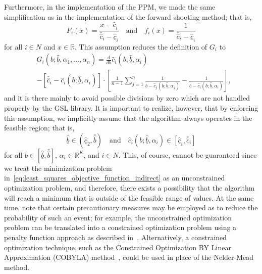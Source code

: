 Furthermore, in the implementation of the PPM, we made the same simplification as in the implementation of the forward shooting method; that is,
\begin{equation*}
  F_i(x) = \frac{x - \underline{\hat{c}}_i}{\bar{\hat{c}}_i - \underline{\hat{c}}_i} \quad\textrm{and}\quad f_i(x) = \frac{1}{\bar{\hat{c}}_i - \underline{\hat{c}}_i}
\end{equation*}
for all $i\in N$ and $x\in\mathbb{R}$. This assumption reduces the definition of $G_i$ to
\begin{align*}
  &G_i(b; \underline{\hat{b}}, \alpha_1, \dotsc, \alpha_n) = \displaystyle\frac{d}{db}\hat{c}_i(b;\underline{\hat{b}}, \alpha_i)\\
  &- \displaystyle\left[ \bar{\hat{c}}_i - \hat{c}_i(b;\underline{\hat{b}}, \alpha_i)\right]\cdot\left[ \frac{1}{n-1}\sum_{j=1}^n\frac{1}{b - \hat{c}_j(b;\underline{\hat{b}}, \alpha_j)} - \frac{1}{b - \hat{c}_i(b;\underline{\hat{b}}, \alpha_i)} \right],
\end{align*}
and it is there mainly to avoid possible divisions by zero which are not handled properly by the GSL library. It is important to realize, however, that by enforcing this assumption, we implicitly assume that the algorithm always operates in the feasible region; that is,
\begin{equation*}
  \underline{\hat{b}}\in (\underline{\hat{c}}_2, \bar{\hat{b}}) \quad\textrm{and}\quad \hat{c}_i(b;\underline{\hat{b}}, \alpha_i)\in [\underline{\hat{c}}_i, \bar{\hat{c}}_i]
\end{equation*}
for all $b\in [\underline{\hat{b}}, \bar{\hat{b}}]$, $\alpha_i\in\mathbb{R}^K$, and $i\in N$. This, of course, cannot be guaranteed since we treat the minimization problem in~\eqref{eq:least_squares_objective_function_indirect} as an unconstrained optimization problem, and therefore, there exists a possibility that the algorithm will reach a minimum that is outside of the feasible range of values. At the same time, note that certain precautionary measures may be employed as to reduce the probability of such an event; for example, the unconstrained optimization problem can be translated into a constrained optimization problem using a penalty function approach as described in~\cite{AvrielPenalty2003}. Alternatively, a constrained optimization technique, such as the Constrained Optimization BY Linear Approximation (COBYLA) method~\cite{Powell1994}, could be used in place of the Nelder-Mead method.

